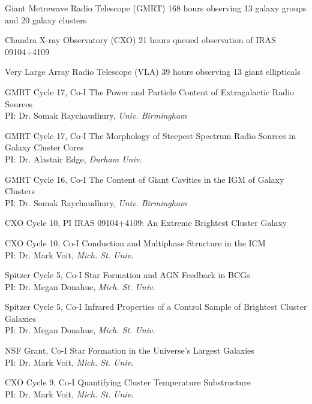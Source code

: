 \documentclass[12pt]{cv}
\begin{document}
\begin{llist}
Giant Metrewave Radio Telescope (GMRT)
168 hours observing 13 galaxy groups and 20 galaxy clusters

Chandra X-ray Observatory (CXO)
21 hours queued observation of IRAS 09104+4109

Very Large Array Radio Telescope (VLA)
39 hours observing 13 giant ellipticals



GMRT Cycle 17, Co-I
The Power and Particle Content of Extragalactic Radio Sources\\%
PI: Dr. Somak Raychaudhury, {\textit{Univ. Birmingham}}

GMRT Cycle 17, Co-I
The Morphology of Steepest Spectrum Radio Sources in Galaxy Cluster Cores\\%
PI: Dr. Alastair Edge, {\textit{Durham Univ.}}

GMRT Cycle 16, Co-I
The Content of Giant Cavities in the IGM of Galaxy Clusters\\%
PI: Dr. Somak Raychaudhury, {\textit{Univ. Birmingham}}

CXO Cycle 10, PI
IRAS 09104+4109: An Extreme Brightest Cluster Galaxy%

CXO Cycle 10, Co-I
Conduction and Multiphase Structure in the ICM\\%
PI: Dr. Mark Voit, {\textit{Mich. St. Univ.}}

Spitzer Cycle 5, Co-I
Star Formation and AGN Feedback in BCGs\\%
PI: Dr. Megan Donahue, {\textit{Mich. St. Univ.}}

Spitzer Cycle 5, Co-I
Infrared Properties of a Control Sample of Brightest Cluster Galaxies\\%
PI: Dr. Megan Donahue, {\textit{Mich. St. Univ.}}

NSF Grant, Co-I
Star Formation in the Universe's Largest Galaxies\\%
PI: Dr. Mark Voit, {\textit{Mich. St. Univ.}}

CXO Cycle 9, Co-I
Quantifying Cluster Temperature Substructure\\%
PI: Dr. Mark Voit, {\textit{Mich. St. Univ.}}


\end{llist}
\end{document}
